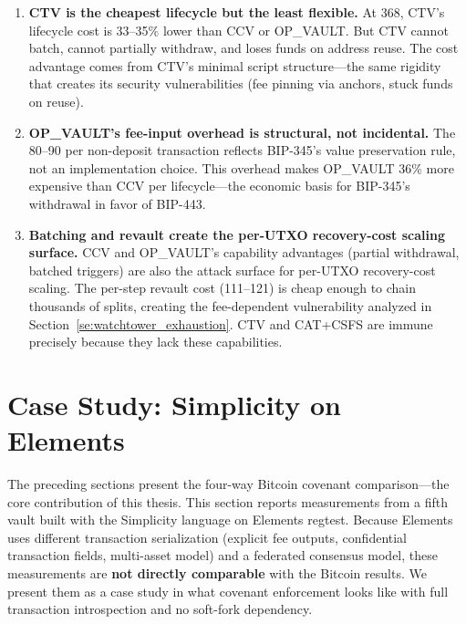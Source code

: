 \begin{enumerate}
\item \textbf{CTV is the cheapest lifecycle but the least flexible.}
  At 368\vB{}, CTV's lifecycle cost is 33--35\% lower than CCV or OP\_VAULT.
  But CTV cannot batch, cannot partially withdraw, and loses funds on address
  reuse. The cost advantage comes from CTV's minimal script structure---the same
  rigidity that creates its security vulnerabilities (fee pinning via anchors,
  stuck funds on reuse).

\item \textbf{OP\_VAULT's fee-input overhead is structural, not incidental.}
  The 80--90\vB{} per non-deposit transaction reflects BIP-345's value preservation
  rule, not an implementation choice. This overhead makes OP\_VAULT 36\% more
  expensive than CCV per lifecycle---the economic basis for BIP-345's withdrawal
  in favor of BIP-443.

\item \textbf{Batching and revault create the per-UTXO recovery-cost scaling surface.}
  CCV and OP\_VAULT's capability advantages (partial withdrawal, batched triggers)
  are also the attack surface for per-UTXO recovery-cost scaling. The per-step revault cost
  (111--121\vB{}) is cheap enough to chain thousands of splits, creating the
  fee-dependent vulnerability analyzed in Section~\ref{se:watchtower_exhaustion}.
  CTV and CAT+CSFS are immune precisely because they lack these capabilities.
\end{enumerate}

\section{Case Study: Simplicity on Elements} \label{se:simplicity_measurements}

The preceding sections present the four-way Bitcoin covenant comparison---the core
contribution of this thesis. This section reports measurements from a fifth vault
built with the Simplicity language on Elements regtest. Because Elements uses
different transaction serialization (explicit fee outputs, confidential transaction
fields, multi-asset model) and a federated consensus model, these measurements are
\textbf{not directly comparable} with the Bitcoin results. We present them as a
case study in what covenant enforcement looks like with full transaction introspection
and no soft-fork dependency.

